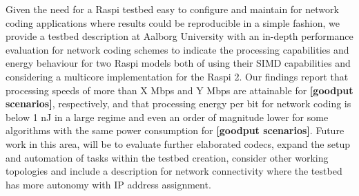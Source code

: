 \label{sec:conclusions}
Given the need for a \ac{Raspi} testbed easy to configure and maintain
for network coding applications where results could be reproducible
in a simple fashion, we provide a testbed description at Aalborg
University with an in-depth performance evaluation for network coding
schemes to indicate the processing capabilities and energy behaviour
for two \ac{Raspi} models both of using their \ac{SIMD} capabilities
and considering a multicore implementation for the \ac{Raspi} 2. Our
findings report that processing speeds of more than X Mbps and Y Mbps are attainable for \textbf{[goodput scenarios]}, respectively, and that
processing energy per bit for network coding is below 1 nJ in a large regime
and even an order of magnitude lower for some algorithms with the same power consumption for \textbf{[goodput scenarios]}. Future work in this area,
will be to evaluate further elaborated codecs, expand the setup and
automation of tasks within the testbed creation, consider other working
topologies and include a description for network connectivity where the
testbed has more autonomy with \ac{IP} address assignment.